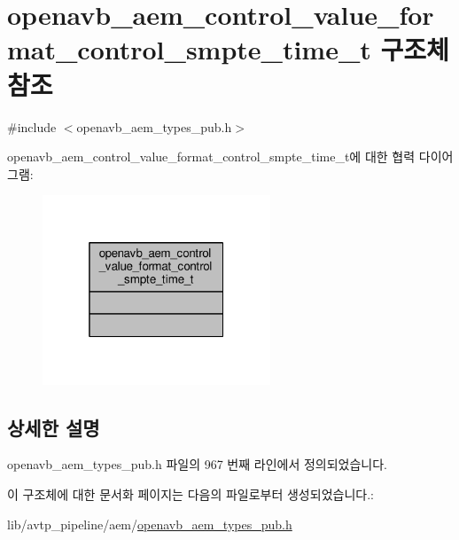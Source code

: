 \hypertarget{structopenavb__aem__control__value__format__control__smpte__time__t}{}\section{openavb\+\_\+aem\+\_\+control\+\_\+value\+\_\+format\+\_\+control\+\_\+smpte\+\_\+time\+\_\+t 구조체 참조}
\label{structopenavb__aem__control__value__format__control__smpte__time__t}


{\ttfamily \#include $<$openavb\+\_\+aem\+\_\+types\+\_\+pub.\+h$>$}



openavb\+\_\+aem\+\_\+control\+\_\+value\+\_\+format\+\_\+control\+\_\+smpte\+\_\+time\+\_\+t에 대한 협력 다이어그램\+:
\nopagebreak
\begin{figure}[H]
\begin{center}
\leavevmode
\includegraphics[width=193pt]{structopenavb__aem__control__value__format__control__smpte__time__t__coll__graph}
\end{center}
\end{figure}


\subsection{상세한 설명}


openavb\+\_\+aem\+\_\+types\+\_\+pub.\+h 파일의 967 번째 라인에서 정의되었습니다.



이 구조체에 대한 문서화 페이지는 다음의 파일로부터 생성되었습니다.\+:\begin{DoxyCompactItemize}
\item 
lib/avtp\+\_\+pipeline/aem/\hyperlink{openavb__aem__types__pub_8h}{openavb\+\_\+aem\+\_\+types\+\_\+pub.\+h}\end{DoxyCompactItemize}
